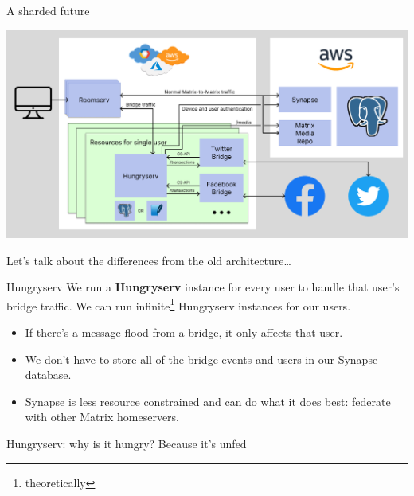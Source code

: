 \documentclass{beeper}
\begin{document}
\begin{frame}{A sharded future}
    \centerline{\includegraphics[width=1.15\textwidth]{images/new-architecture}}

    Let's talk about the differences from the old architecture\ldots
\end{frame}

\begin{frame}{Hungryserv}
    We run a \textbf{Hungryserv} instance for every user to handle that user's
    bridge traffic.
    \pause
    We can run infinite\footnote[frame]{theoretically} Hungryserv instances for
    our users.
    \pause

    \begin{itemize}[<+->]
        \item If there's a message flood from a bridge, it only affects that
            user.
        \item We don't have to store all of the bridge events and users in our
            Synapse database.
        \item Synapse is less resource constrained and can do what it does best:
            federate with other Matrix homeservers.
    \end{itemize}
    \pause[\thebeamerpauses]
\end{frame}

\begin{frame}{Hungryserv: why is it hungry?}
    \Large
    Because it's unfed
\end{frame}


\end{document}
